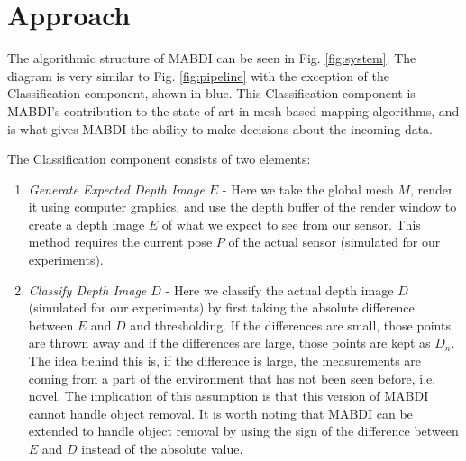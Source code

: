 \chapter{Approach}	\label{chapter:approach}

The algorithmic structure of MABDI can be seen in Fig. \ref{fig:system}. The
diagram is very similar to Fig. \ref{fig:pipeline} with the exception of the
Classification component, shown in blue. This Classification component is
MABDI's contribution to the state-of-art in mesh based mapping algorithms, and
is what gives MABDI the ability to make decisions about the incoming data.

The Classification component consists of two elements:
\begin{enumerate}
    \item \textit{Generate Expected Depth Image $E$} - Here we take the global
    mesh $M$, render it using computer graphics, and use the depth buffer of the
    render window to create a depth image $E$ of what we expect to see from our
    sensor. This method requires the current pose $P$ of the actual sensor
    (simulated for our experiments).
    \item \textit{Classify Depth Image $D$} - Here we classify the actual depth
    image $D$ (simulated for our experiments) by first taking the absolute
    difference between $E$ and $D$ and thresholding. If the differences are
    small, those points are thrown away and if the differences are large, those
    points are kept as $D_n$. The idea behind this is, if the difference is
    large, the measurements are coming from a part of the environment that has
    not been seen before, i.e. novel. The implication of this assumption is that
    this version of MABDI cannot handle object removal. It is worth noting
    that MABDI can be extended to handle object removal by using the sign of the
    difference between $E$ and $D$ instead of the absolute value.
\end{enumerate}

